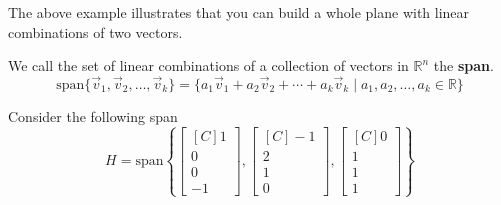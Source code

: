 \begin{remark}
The above example illustrates that you can build a whole plane with linear combinations of two vectors.
\end{remark}
\begin{definition}
We call the set of linear combinations of a collection of vectors in $\mathbb{R}^n$ the \textbf{span}.
\[
\text{span}\{ \vec{v}_1, \vec{v}_2, \ldots, \vec{v}_k \}=
\{a_1\vec{v}_1+a_2\vec{v}_2+\cdots+a_k\vec{v}_k \mid a_1, a_2, \ldots , a_k \in \mathbb{R} \}
\]
\end{definition}

\begin{example} Consider the following span
\[
H=\text{span}\left\{
\begin{bmatrix*}[C]1 \\ 0 \\ 0 \\ -1\end{bmatrix*},
\begin{bmatrix*}[C]-1 \\ 2 \\ 1 \\ 0\end{bmatrix*},
\begin{bmatrix*}[C]0 \\ 1 \\ 1 \\ 1\end{bmatrix*}
\right\}
\]


\end{example}
